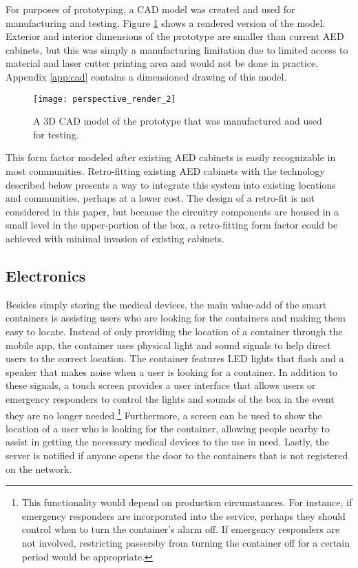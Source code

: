For purposes of prototyping, a CAD model was created and used for manufacturing and testing. Figure \ref{fig:proto-render} shows a rendered version of the model. Exterior and interior dimensions of the prototype are smaller than current AED cabinets, but this was simply a manufacturing limitation due to limited access to material and laser cutter printing area and would not be done in practice. Appendix \ref{app:cad} contains a dimensioned drawing of this model.

\begin{figure}[h]
    \begin{center}
    \texttt{[image: perspective\_render\_2]}
    \caption{A 3D CAD model of the prototype that was manufactured and used for testing.}
    \label{fig:proto-render}
    \end{center}
\end{figure}

This form factor modeled after existing AED cabinets is easily recognizable in most communities. Retro-fitting existing AED cabinets with the technology described below presents a way to integrate this system into existing locations and communities, perhaps at a lower cost. The design of a retro-fit is not considered in this paper, but because the circuitry components are housed in a small level in the upper-portion of the box, a retro-fitting form factor could be achieved with minimal invasion of existing cabinets.

\subsection{Electronics}

Besides simply storing the medical devices, the main value-add of the smart containers is assisting users who are looking for the containers and making them easy to locate. Instead of only providing the location of a container through the mobile app, the container uses physical light and sound signals to help direct users to the correct location. The container features LED lights that flash and a speaker that makes noise when a user is looking for a container. In addition to these signals, a touch screen provides a user interface that allows users or emergency responders to control the lights and sounds of the box in the event they are no longer needed.\footnote{This functionality would depend on production circumstances. For instance, if emergency responders are incorporated into the service, perhaps they should control when to turn the container's alarm off. If emergency responders are not involved, restricting passersby from turning the container off for a certain period would be appropriate.} Furthermore, a screen can be used to show the location of a user who is looking for the container, allowing people nearby to assist in getting the necessary medical devices to the use in need. Lastly, the server is notified if anyone opens the door to the containers that is not registered on the network.

